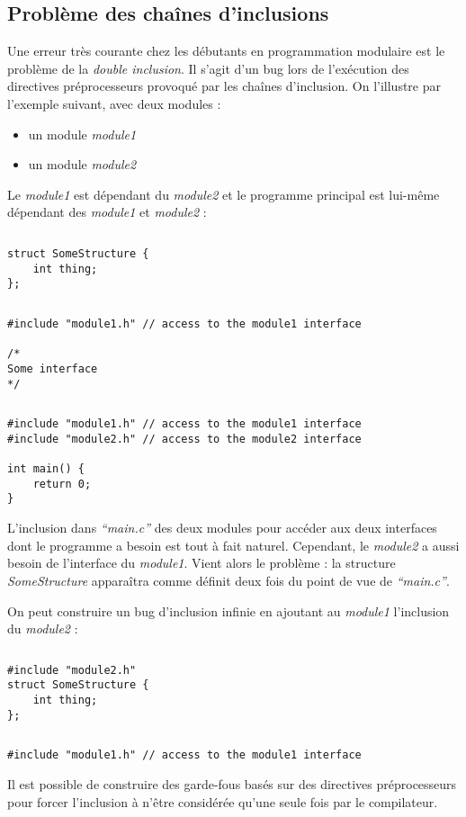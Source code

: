 \documentclass[../../../main.tex]{subfiles}
\begin{document}
\subsection{Problème des chaînes d'inclusions}
Une erreur très courante chez les débutants en programmation modulaire est le problème de la \textit{double inclusion}. Il s'agit d'un bug lors de l'exécution des directives préprocesseurs provoqué par les chaînes d'inclusion. On l'illustre par l'exemple suivant, avec deux modules :
\begin{itemize}
	\item un module \textit{module1}
	\item un module \textit{module2}
\end{itemize}
Le \textit{module1} est dépendant du \textit{module2} et le programme principal est lui-même dépendant des \textit{module1} et \textit{module2} :
\begin{lstlisting}[title=module1.h]
\end{lstlisting}
\begin{verbatim}
struct SomeStructure {
	int thing;
};
\end{verbatim}
\begin{lstlisting}[title=module2.h]
\end{lstlisting}
\begin{verbatim}
#include "module1.h" // access to the module1 interface

/*
Some interface
*/
\end{verbatim}
\begin{lstlisting}[title=main.c]
\end{lstlisting}
\begin{verbatim}
#include "module1.h" // access to the module1 interface
#include "module2.h" // access to the module2 interface

int main() {
	return 0;
}
\end{verbatim}
L'inclusion dans \textit{``main.c''} des deux modules pour accéder aux deux interfaces dont le programme a besoin est tout à fait naturel. Cependant, le \textit{module2} a aussi besoin de l'interface du \textit{module1}. Vient alors le problème : la structure \textit{SomeStructure} apparaîtra comme définit deux fois du point de vue de \textit{``main.c''}.
 
On peut construire un bug d'inclusion infinie en ajoutant au \textit{module1} l'inclusion du \textit{module2} :
\begin{lstlisting}[title=module1.h]
\end{lstlisting}
\begin{verbatim}
#include "module2.h"
struct SomeStructure {
	int thing;
};
\end{verbatim}
\begin{lstlisting}[title=module2.h]
\end{lstlisting}
\begin{verbatim}
#include "module1.h" // access to the module1 interface
\end{verbatim}
Il est possible de construire des garde-fous basés sur des directives préprocesseurs pour forcer l'inclusion à n'être considérée qu'une seule fois par le compilateur.
\end{document}
